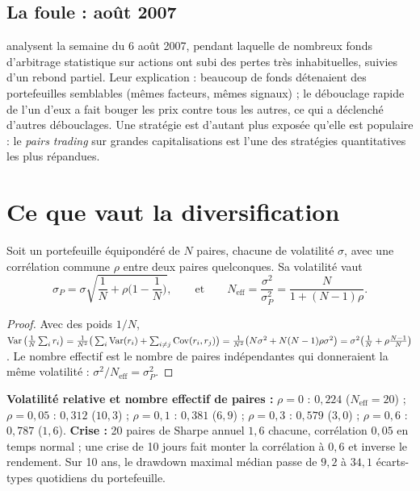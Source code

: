 \subsection{La foule : août 2007}

\citet{khandanilo2011} analysent la semaine du 6 août 2007, pendant laquelle de nombreux fonds d'arbitrage statistique sur actions ont subi des pertes très inhabituelles, suivies d'un rebond partiel. Leur explication : beaucoup de fonds détenaient des portefeuilles semblables (mêmes facteurs, mêmes signaux) ; le débouclage rapide de l'un d'eux a fait bouger les prix contre tous les autres, ce qui a déclenché d'autres débouclages. Une stratégie est d'autant plus exposée qu'elle est populaire : le \emph{pairs trading} sur grandes capitalisations est l'une des stratégies quantitatives les plus répandues.

\section{Ce que vaut la diversification}

\begin{proposition}\label{c17:prop:div}
Soit un portefeuille équipondéré de $N$ paires, chacune de volatilité $\sigma$, avec une corrélation commune $\rho$ entre deux paires quelconques. Sa volatilité vaut
\[
\sigma_P = \sigma\sqrt{\frac1N + \rho\Big(1 - \frac1N\Big)}, \qquad\text{et}\qquad N_{\text{eff}} = \frac{\sigma^2}{\sigma_P^2} = \frac{N}{1 + (N-1)\rho}.
\]
\end{proposition}
\begin{proof}
Avec des poids $1/N$, $\operatorname{Var}\big(\frac1N\sum_i r_i\big) = \frac1{N^2}\big(\sum_i\operatorname{Var}(r_i) + \sum_{i\ne j}\operatorname{Cov}(r_i,r_j)\big) = \frac{1}{N^2}\big(N\sigma^2 + N(N-1)\rho\sigma^2\big) = \sigma^2\big(\frac1N + \rho\frac{N-1}{N}\big)$. Le nombre effectif est le nombre de paires indépendantes qui donneraient la même volatilité : $\sigma^2/N_{\text{eff}} = \sigma_P^2$.
\end{proof}

\begin{codebox}[ — E4, 20 paires]
\textbf{Volatilité relative et nombre effectif de paires :} $\rho = 0$ : $0{,}224$ ($N_{\text{eff}} = 20$) ; $\rho = 0{,}05$ : $0{,}312$ ($10{,}3$) ; $\rho = 0{,}1$ : $0{,}381$ ($6{,}9$) ; $\rho = 0{,}3$ : $0{,}579$ ($3{,}0$) ; $\rho = 0{,}6$ : $0{,}787$ ($1{,}6$). \textbf{Crise :} 20 paires de Sharpe annuel $1{,}6$ chacune, corrélation $0{,}05$ en temps normal ; une crise de 10 jours fait monter la corrélation à $0{,}6$ et inverse le rendement. Sur 10 ans, le drawdown maximal médian passe de $9{,}2$ à $34{,}1$ écarts-types quotidiens du portefeuille.
\end{codebox}

